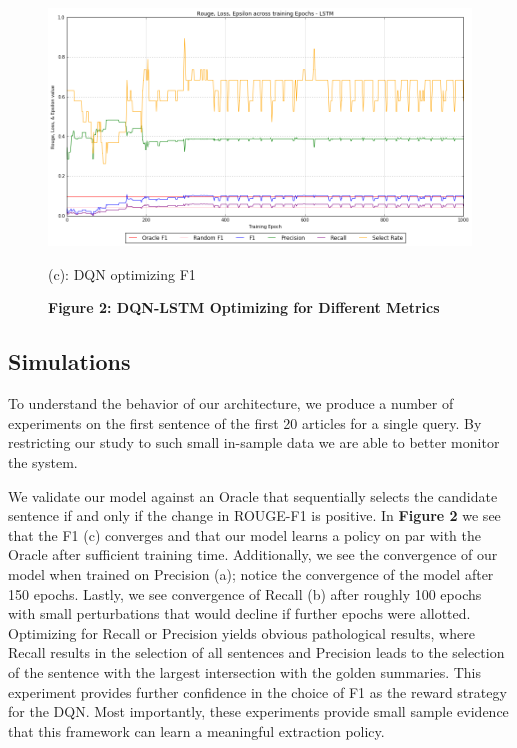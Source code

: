 \documentclass[12pt]{article}
\begin{document}
\begin{figure}
  \centering
  \begin{minipage}[b]{0.6\textwidth}
    \captionsetup{labelformat=empty}
    \includegraphics[width=\textwidth]{DQN_LSTM_F1}
    \caption{ \scriptsize (c): DQN optimizing F1}
  \end{minipage}
    \caption*{\textbf{Figure 2: DQN-LSTM Optimizing for Different Metrics}}
\end{figure}

\subsection{Simulations}
To understand the behavior of our architecture, we produce a number of experiments on the first sentence of the first 20 articles for a single query. By restricting our study to such small in-sample data we are able to better monitor the system.

We validate our model against an Oracle that sequentially selects the candidate sentence if and only if the change in ROUGE-F1 is positive. In \textbf{Figure 2} we see that the F1 (c) converges and that our model learns a policy on par with the Oracle after sufficient training time. Additionally, we see the convergence of our model when trained on Precision (a); notice the convergence of the model after 150 epochs. Lastly, we see convergence of Recall (b) after roughly 100 epochs with small perturbations that would decline if further epochs were allotted. Optimizing for Recall or Precision yields obvious pathological results, where Recall results in the selection of all sentences and Precision leads to the selection of the sentence with the largest intersection with the golden summaries. This experiment provides further confidence in the choice of F1 as the reward strategy for the DQN. Most importantly, these experiments provide small sample evidence that this framework can learn a meaningful extraction policy.
\end{document}
